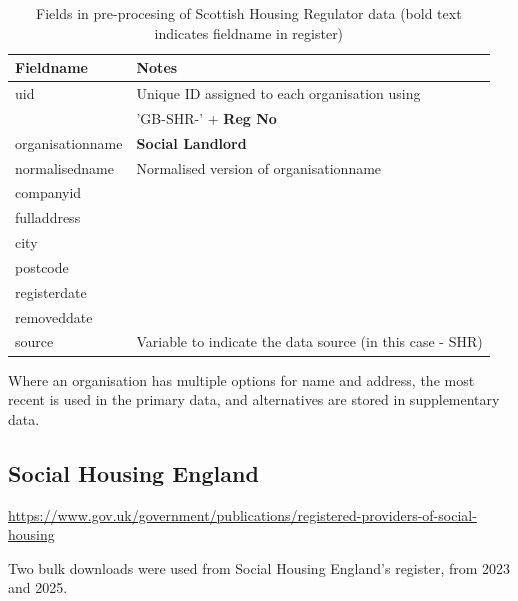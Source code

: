 \documentclass{article}
\begin{document}
\begin{table}[h]
  \centering
  \begin{tabularx}{\textwidth}{|l|X|}
    \hline
    Fieldname  &	Notes \\
    \hline \hline
uid & Unique ID assigned to each organisation using \\
&'GB-SHR-' + \textbf{Reg No}\\ \hline
organisationname & \textbf{Social Landlord} \\ \hline
normalisedname & Normalised version of organisationname\\ \hline
companyid &  \\ \hline
fulladdress &  \\ \hline
city & \\ \hline
postcode & \\ \hline
registerdate & \\ \hline
removeddate & \\ \hline
source & Variable to indicate the data source (in this case - SHR) \\ \hline
\hline 
\end{tabularx}
  \caption{Fields in pre-procesing of Scottish Housing Regulator data (bold text indicates fieldname in register)}
  \label{tab:shr_preprocess}
  
\end{table}

Where an organisation has multiple options for name and address, the most recent
is used in the primary data, and alternatives are stored in supplementary data.



\clearpage
\subsection{Social Housing England 	}
\url{https://www.gov.uk/government/publications/registered-providers-of-social-housing}

Two bulk downloads were used from Social Housing England's register, from 2023 and 2025.
\end{document}
